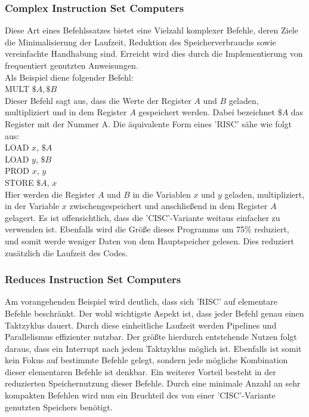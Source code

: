 \subsubsection{Complex Instruction Set Computers}
Diese Art eines Befehlssatzes bietet eine Vielzahl komplexer Befehle, deren Ziele die Minimalisierung der Laufzeit, Reduktion des Speicherverbrauchs sowie vereinfachte Handhabung sind. Erreicht wird dies durch die Implementierung von frequentiert genutzten Anweisungen.\\
Als Beispiel diene folgender Befehl:\\

MULT $\$A, \$B$\\
\newline
Dieser Befehl sagt aus, dass die Werte der Register $A$ und $B$ geladen, multipliziert und in dem Register $A$ gespeichert werden. Dabei bezeichnet $\$A$ das Register mit der Nummer A. Die äquivalente Form eines 'RISC' sähe wie folgt aus:\\
\newpage
LOAD $x$, $\$A$\\ 
LOAD $y$, $\$B$\\
PROD $x$, $y$\\
STORE $\$A$, $x$\\
\newline
Hier werden die Register $A$ und $B$ in die Variablen $x$ und $y$ geladen, multipliziert, in der Variable $x$ zwischengespeichert und anschließend in dem Register $A$ gelagert. Es ist offensichtlich, dass die 'CISC'-Variante weitaus einfacher zu verwenden ist. Ebenfalls wird die Größe dieses Programms um 75\% reduziert, und somit werde weniger Daten von dem Hauptspeicher gelesen. Dies reduziert zusätzlich die Laufzeit des Codes.

\subsubsection{Reduces Instruction Set Computers}
Am vorangehenden Beispiel wird deutlich, dass sich 'RISC' auf elementare Befehle beschränkt. Der wohl wichtigste Aspekt ist, dass jeder Befehl genau einen Taktzyklus dauert. Durch diese einheitliche Laufzeit werden Pipelines und Parallelismus effizienter nutzbar. Der größte hierdurch entstehende Nutzen folgt daraus, dass ein Interrupt nach jedem Taktzyklus möglich ist. Ebenfalls ist somit kein Fokus auf bestimmte Befehle gelegt, sondern jede mögliche Kombination dieser elementaren Befehle ist denkbar. Ein weiterer Vorteil besteht in der reduzierten Speichernutzung dieser Befehle. Durch eine minimale Anzahl an sehr kompakten Befehlen wird nun ein Bruchteil des von einer 'CISC'-Variante genutzten Speichers benötigt.


